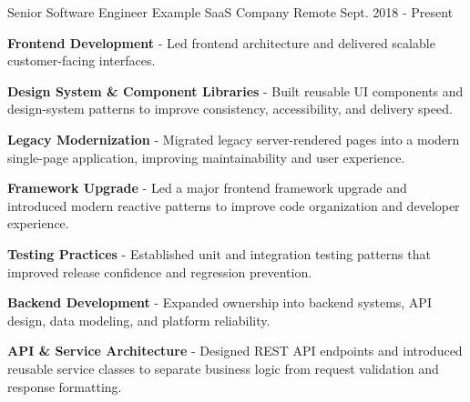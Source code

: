 

\begin{cventries}

    \cventry
    {Senior Software Engineer}
    {Example SaaS Company}
    {Remote}
    {Sept. 2018 - Present}
    {
        \vspace{-4mm}
        \begin{cvitems}
            \item {\textbf{Frontend Development} - Led frontend architecture and delivered scalable customer-facing interfaces.}
        \end{cvitems}
        \begin{cvsubitems}
            \item {\textbf{Design System \& Component Libraries} - Built reusable UI components and design-system patterns to improve consistency, accessibility, and delivery speed.}
            \item {\textbf{Legacy Modernization} - Migrated legacy server-rendered pages into a modern single-page application, improving maintainability and user experience.}
            \item {\textbf{Framework Upgrade} - Led a major frontend framework upgrade and introduced modern reactive patterns to improve code organization and developer experience.}
            \item {\textbf{Testing Practices} - Established unit and integration testing patterns that improved release confidence and regression prevention.}
        \end{cvsubitems}
        \begin{cvitems}
            \item {\textbf{Backend Development} - Expanded ownership into backend systems, API design, data modeling, and platform reliability.}
        \end{cvitems}
        \begin{cvsubitems}
            \item {\textbf{API \& Service Architecture} - Designed REST API endpoints and introduced reusable service classes to separate business logic from request validation and response formatting.}

\end{cvsubitems}}
\end{cventries}
